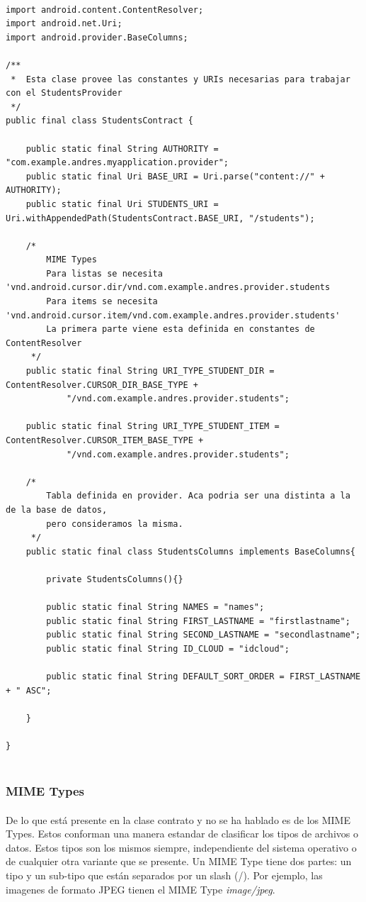 \documentclass[10pt]{extarticle}
\begin{document}
\begin{lstlisting}

import android.content.ContentResolver;
import android.net.Uri;
import android.provider.BaseColumns;

/**
 *  Esta clase provee las constantes y URIs necesarias para trabajar con el StudentsProvider
 */
public final class StudentsContract {

    public static final String AUTHORITY = "com.example.andres.myapplication.provider";
    public static final Uri BASE_URI = Uri.parse("content://" + AUTHORITY);
    public static final Uri STUDENTS_URI = Uri.withAppendedPath(StudentsContract.BASE_URI, "/students");

    /*
        MIME Types
        Para listas se necesita  'vnd.android.cursor.dir/vnd.com.example.andres.provider.students
        Para items se necesita 'vnd.android.cursor.item/vnd.com.example.andres.provider.students'
        La primera parte viene esta definida en constantes de ContentResolver
     */
    public static final String URI_TYPE_STUDENT_DIR = ContentResolver.CURSOR_DIR_BASE_TYPE +
            "/vnd.com.example.andres.provider.students";

    public static final String URI_TYPE_STUDENT_ITEM = ContentResolver.CURSOR_ITEM_BASE_TYPE +
            "/vnd.com.example.andres.provider.students";

    /*
        Tabla definida en provider. Aca podria ser una distinta a la de la base de datos,
        pero consideramos la misma.
     */
    public static final class StudentsColumns implements BaseColumns{

        private StudentsColumns(){}

        public static final String NAMES = "names";
        public static final String FIRST_LASTNAME = "firstlastname";
        public static final String SECOND_LASTNAME = "secondlastname";
        public static final String ID_CLOUD = "idcloud";

        public static final String DEFAULT_SORT_ORDER = FIRST_LASTNAME + " ASC";

    }

}
     
\end{lstlisting}

\subsubsection{MIME Types}

\paragraph{}
De lo que está presente en la clase contrato y no se ha hablado es de los MIME Types. Estos conforman una manera estandar de clasificar los tipos de archivos o datos. Estos tipos son los mismos siempre, independiente del sistema operativo o de cualquier otra variante que se presente. Un MIME Type tiene dos partes: un tipo y un sub-tipo que están separados por un slash (/). Por ejemplo, las imagenes de formato JPEG tienen el MIME Type \textit{image/jpeg}.
\end{document}
